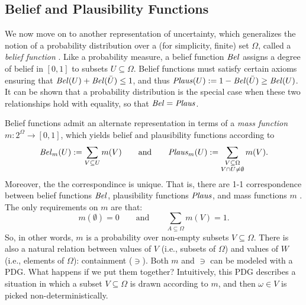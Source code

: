 \subsection{Belief and Plausibility Functions}
    \label{sec:belplaus-as-pdg}
We now move on to another representation of uncertainty, which generalizes the notion of a probability distribution over a (for simplicity, finite) set $\Omega$, called a \emph{belief function} \cite{shafer1990probability}. 
Like a probability measure,
a belief function $\mathit{Bel}$ assigns a degree of belief in $[0,1]$ to subsets $U \subseteq \Omega$.  
Belief functions must satisfy certain axioms ensuring that $\mathit{Bel}(U) + \mathit{Bel}(\bar U) \le 1$, and thus $\mathit{Plaus}(U) := 1 - \mathit{Bel}(\bar U) \ge \mathit{Bel}(U)$. 
It can be shown that a probability distribution is the special case when these two relationships hold with equality, so that $\mathit{Bel} = \mathit{Plaus}$.  

Belief functions admit an alternate representation in terms of a \emph{mass function} $m : 2^\Omega \to [0,1]$, which yields belief and plausibility functions according to
\[
    \mathit{Bel}_m(U) := \sum_{V \subseteq U} m(V)
    \qquad\text{and}\qquad
    \mathit{Plaus}_m(U) := \sum_{\substack{V \subseteq \Omega \\ V \cap U \ne \emptyset}} m(V).
\]
Moreover, the the correspondince is unique.  That is, there are 1-1 correspondence between belief functions $\mathit{Bel}$, plausibility functions $\mathit{Plaus}$, and mass functions $m$ \cite[Thm 2.6.3]{halpern-RAU}. 
The only requirements on $m$ are that:
\[
m(\emptyset) = 0
\qquad\text{and}\qquad
\sum_{A \subseteq \Omega} m(V) = 1.
\]
So, in other words, $m$ is a probability over non-empty subsets $V \subseteq \Omega$. 
There is also a natural relation between values of $V$ (i.e., subsets of $\Omega$) and values of $W$ (i.e., elements of $\Omega$): containment ($\ni$). 
Both $m$ and $\ni$ can be modeled with a PDG. What happens if we put them together?
Intuitively, this PDG describes a situation in which a subset $V \subseteq \Omega$ is drawn according to $m$, and then $\omega \in V$ is picked non-deterministically.

